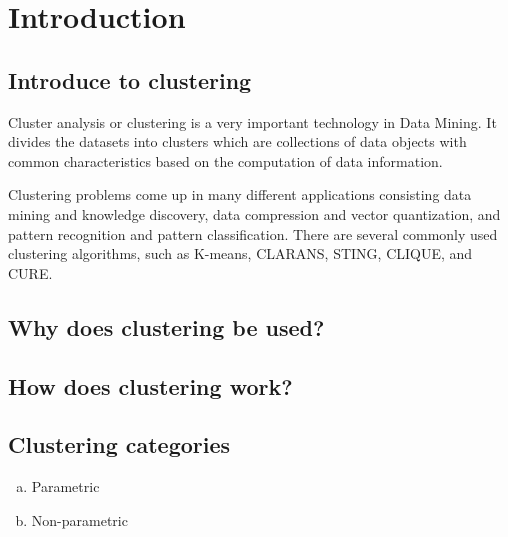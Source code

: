 \section{Introduction}
\subsection{Introduce to clustering}

\forceindent Cluster analysis or clustering is a very important technology in Data Mining. It divides the datasets into clusters which are collections of data objects with common characteristics based on the computation of data information.

Clustering problems come up in many different applications consisting data mining and knowledge discovery, data compression and vector quantization, and pattern recognition and pattern classification. There are several commonly used clustering algorithms, such as K-means, CLARANS, STING, CLIQUE, and CURE.  %


\subsection{Why does clustering be used?}

\subsection{How does clustering work?}

\subsection{Clustering categories}
\begin{enumerate}[a.]
	\item Parametric
	\item Non-parametric
\end{enumerate}